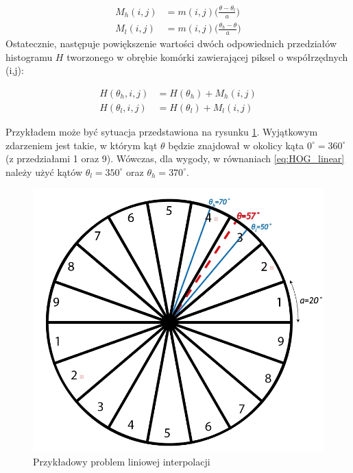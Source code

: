 \begin{equation}
\label{eq:HOG_linear}
\left.\begin{aligned}
M_h(i,j)&=m(i,j)\bigg(\frac{\theta-\theta_l}{a}\bigg)\\
M_l(i,j)&=m(i,j)\bigg(\frac{\theta_h-\theta}{a}\bigg)
\end{aligned}\right.
\end{equation}
Ostatecznie, następuje powiększenie wartości dwóch odpowiednich przedziałów histogramu $H$ tworzonego w obrębie komórki zawierającej piksel o współrzędnych (i,j):

\begin{equation}
\label{eq:HOG_increment}
\left.\begin{aligned} 
H(\theta_h,i,j)&=H(\theta_h)+M_h(i,j) \\ 
H(\theta_l,i,j)&=H(\theta_l)+M_l(i,j)
\end{aligned}\right.
\end{equation}

Przykładem może być sytuacja przedstawiona na rysunku \ref{fig:HOG_interpolation}. Wyjątkowym zdarzeniem jest takie, w którym kąt $\theta$ będzie znajdował w okolicy kąta $0^{\circ}=360^{\circ}$ (z przedziałami 1 oraz 9). Wówczas, dla wygody, w równaniach \ref{eq:HOG_linear} należy użyć kątów $\theta_l=350^{\circ}$ oraz $\theta_h=370^{\circ}$.

\begin{figure}[h]
	\centering
	\hspace*{1cm}
	\includegraphics[width=12cm]{3_HOG_interpolation.jpg}
	\caption{Przykładowy problem liniowej interpolacji}
	\label{fig:HOG_interpolation}
\end{figure}

